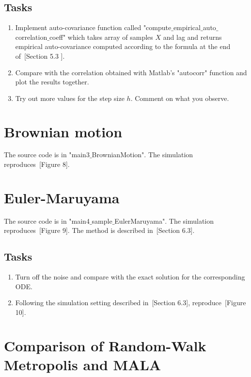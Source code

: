 \documentclass{scrartcl}
\begin{document}
\subsection{Tasks}
\begin{enumerate}
\item Implement auto-covariance function called "compute$\_$empirical$\_$auto$\_$correlation$\_$coeff" which takes array of samples $X$ and lag and returns empirical auto-covariance computed according to the formula at the end of~\cite{sanz2014markov}[Section 5.3 ].
\item Compare with the correlation obtained with Matlab's "autocorr" function and plot the results together.
\item Try out more values for the step size $h$. Comment on what you observe.
\end{enumerate}


\section{Brownian motion}

The source code is in "main3$\_$BrownianMotion". The simulation reproduces~\cite{sanz2014markov}[Figure 8].



\section{Euler-Maruyama}

The source code is in "main4$\_$sample$\_$EulerMaruyama". The simulation reproduces~\cite{sanz2014markov}[Figure 9]. The method is described in~\cite{sanz2014markov}[Section 6.3].

\subsection{Tasks}
\begin{enumerate}
\item Turn off the noise and compare with the exact solution for the corresponding ODE. 
\item Following the simulation setting described in~\cite{sanz2014markov}[Section 6.3], reproduce~\cite{sanz2014markov}[Figure 10].
\end{enumerate}


\section{Comparison of Random-Walk Metropolis and MALA}
\end{document}
